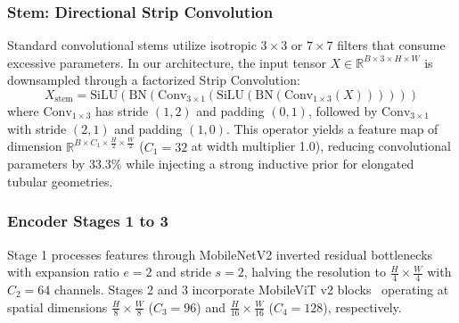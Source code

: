 \documentclass[conference]{IEEEtran}
\begin{document}
\subsubsection{Stem: Directional Strip Convolution}
Standard convolutional stems utilize isotropic $3\times3$ or $7\times7$ filters that consume excessive parameters. In our architecture, the input tensor $X \in \mathbb{R}^{B \times 3 \times H \times W}$ is downsampled through a factorized Strip Convolution:
\begin{equation}
    X_{\text{stem}} = \text{SiLU}\left(\text{BN}\left(\text{Conv}_{3\times1}\left(\text{SiLU}\left(\text{BN}\left(\text{Conv}_{1\times3}(X)\right)\right)\right)\right)\right)
    \label{eq:strip_conv}
\end{equation}
where $\text{Conv}_{1\times3}$ has stride $(1, 2)$ and padding $(0, 1)$, followed by $\text{Conv}_{3\times1}$ with stride $(2, 1)$ and padding $(1, 0)$. This operator yields a feature map of dimension $\mathbb{R}^{B \times C_1 \times \frac{H}{2} \times \frac{W}{2}}$ ($C_1=32$ at width multiplier 1.0), reducing convolutional parameters by 33.3\% while injecting a strong inductive prior for elongated tubular geometries.

\subsubsection{Encoder Stages 1 to 3}
Stage 1 processes features through MobileNetV2 inverted residual bottlenecks~\cite{sandler2018mobilenetv2} with expansion ratio $e=2$ and stride $s=2$, halving the resolution to $\frac{H}{4} \times \frac{W}{4}$ with $C_2=64$ channels. Stages 2 and 3 incorporate MobileViT v2 blocks~\cite{mehta2022mobilevit} operating at spatial dimensions $\frac{H}{8} \times \frac{W}{8}$ ($C_3=96$) and $\frac{H}{16} \times \frac{W}{16}$ ($C_4=128$), respectively.
\end{document}
